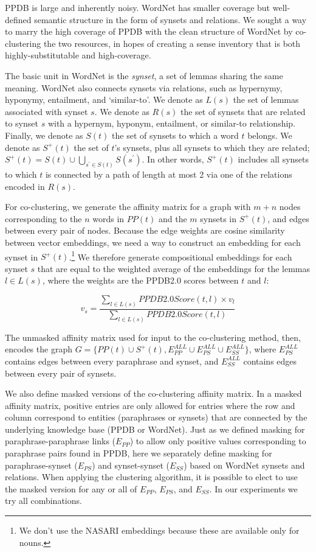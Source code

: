 \documentclass[11pt]{article}
\begin{document}
	PPDB is large and inherently noisy. WordNet  
	has smaller coverage but well-defined semantic structure in the form of synsets and relations. We sought a way to marry the high coverage of PPDB with the clean structure of WordNet by co-clustering the two resources, in hopes of creating a sense inventory that is both highly-substitutable and high-coverage. 
	
	The basic unit in WordNet is the \textit{synset}, a set of lemmas sharing the same meaning. WordNet also connects synsets via relations, such as hypernymy, hyponymy, entailment, and `similar-to'. We denote as $L(s)$ the set of lemmas associated with synset $s$. We denote as $R(s)$ the set of synsets that are related to synset $s$ with a hypernym, hyponym, entailment, or similar-to relationship. Finally, we denote as $S(t)$ the set of synsets to which a word $t$ belongs. We denote as $S^+(t)$ the set of $t$'s synsets, plus all synsets to which they are related; $S^+(t) = S(t) \cup \bigcup_{s^\prime \in S(t)} S(s^\prime)$. In other words, $S^+(t)$ includes all synsets to which $t$ is connected by a path of length at most 2 via one of the relations encoded in $R(s)$.
	
	For co-clustering, we generate the affinity matrix for a graph with $m+n$ nodes corresponding to the $n$ words in $PP(t)$ and the $m$ synsets in $S^+(t)$, and edges between every pair of nodes. Because the edge weights are cosine similarity between vector embeddings, we need a way to construct an embedding for each synset in $S^+(t)$.\footnote{We don't use the NASARI embeddings \cite{camachocollados-pilehvar-navigli:2015:NAACL-HLT} because these are available only for nouns.} We therefore generate compositional embeddings for each synset $s$ that are equal to the weighted average of the embeddings for the lemmas $l \in L(s)$, where the weights are the PPDB2.0 scores between $t$ and $l$:
	
	\[v_s = \frac{\sum_{l \in L(s)} PPDB2.0Score(t, l) \times v_l}{\sum_{l \in L(s)} PPDB2.0Score(t, l)}\]
	
	\noindent The unmasked affinity matrix used for input to the co-clustering method, then, encodes the graph $G = \{PP(t) \cup S^+(t), E_{PP}^{ALL} \cup E_{PS}^{ALL} \cup E_{SS}^{ALL} \}$, where $E_{PS}^{ALL}$ contains edges between every paraphrase and synset, and $E_{SS}^{ALL}$ contains edges between every pair of synsets.
	
	We also define masked versions of the co-clustering affinity matrix. In a masked affinity matrix, positive entries are only allowed for entries where the row and column correspond to entities (paraphrases or synsets) that are connected by the underlying knowledge base (PPDB or WordNet). Just as we defined masking for paraphrase-paraphrase links ($E_{PP}$) to allow only positive values corresponding to paraphrase pairs found in PPDB, here we separately define masking for paraphrase-synset ($E_{PS}$) and synset-synset ($E_{SS}$) based on WordNet synsets and relations. When applying the clustering algorithm, it is possible to elect to use the masked version for any or all of $E_{PP}$, $E_{PS}$, and $E_{SS}$. In our experiments we try all combinations.
	
\end{document}
